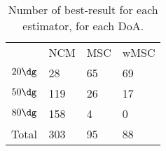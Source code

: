 \begin{table}[!t]
	\centering
	\renewcommand{\arraystretch}{1.4}
	\begin{tabular}{l | l l l}
		& NCM & MSC & wMSC \\
		\hhline{====}
		$20\dg$ & 28 & 65 & 69 \\
		$50\dg$ & 119 & 26 & 17 \\
		$80\dg$ & 158 & 4 & 0 \\
		\hline
		Total & 303 & 95 & 88         
	\end{tabular}
	\caption{Number of best-result for each estimator, for each DoA.}
	\label{tab:sec3:doa_estim_count_best}
\end{table}